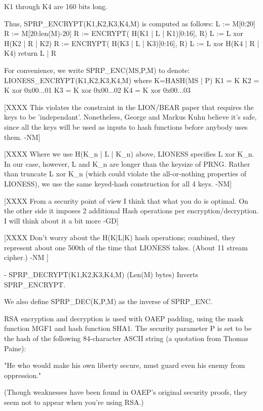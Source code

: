   K1 through K4 are 160 bits long.

  Thus, SPRP_ENCRYPT(K1,K2,K3,K4,M) is computed as follows:
            L := M[0:20]
            R := M[20:len(M)-20]
            R := ENCRYPT( H(K1 | L | K1)[0:16], R)
            L := L xor H(K2 | R | K2)
            R := ENCRYPT( H(K3 | L | K3)[0:16], R)
            L := L xor H(K4 | R | K4) 
            return L | R

  For convenience, we write SPRP_ENC(MS,P,M) to denote:
       LIONESS_ENCRYPT(K1,K2,K3,K4,M)
       where K=HASH(MS | P)
             K1 = K
             K2 = K xor 0x00...01
             K3 = K xor 0x00...02
             K4 = K xor 0x00...03

  [XXXX This violates the constraint in the LION/BEAR paper that
        requires the keys to be 'independant'.  Nonetheless, George
	and Markus Kuhn believe it's safe, since all the keys
        will be used as inputs to hash functions before anybody
        uses them. -NM]

  [XXXX Where we use H(K_n | L | K_n) above, LIONESS specifies 
        L xor K_n.  In our case, however, L and K_n are longer than
        the keysize of PRNG.  Rather than truncate L xor K_n (which
        could violate the all-or-nothing properties of LIONESS),
        we use the same keyed-hash construction for all 4 keys. -NM]

  [XXXX From a security point of view I think that what you do is
        optimal. On the other side it imposes 2 additional Hash
        operations per encryption/decryption. I will think about it a
        bit more -GD]

  [XXXX Don't worry about the H(K|L|K) hash operations; combined, they 
        represent about one 500th of the time that LIONESS takes.
        (About 11%
        stream cipher.) -NM ]

- SPRP_DECRYPT(K1,K2,K3,K4,M) (Len(M) bytes) Inverts SPRP_ENCRYPT.

  We also define SPRP_DEC(K,P,M) as the inverse of SPRP_ENC.
    
RSA encryption and decryption is used with OAEP padding, using the 
mask function MGF1 and hash function SHA1.  The security
parameter P is set to be the hash of the following 84-character ASCII
string (a quotation from Thomas Paine): 

     "He who would make his own liberty secure, must guard even his
      enemy from oppression." 

(Though weaknesses have been found in OAEP's original security proofs,
they seem not to appear when you're using RSA.)

